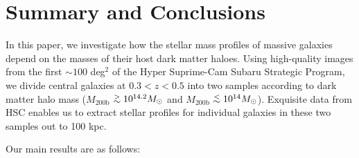 \documentclass[a4paper,fleqn,usenatbib]{mnras}
\def\simlt{\lower.5ex\hbox{$\; \buildrel < \over {\sim} \;$}}
\def\simgt{\lower.5ex\hbox{$\; \buildrel > \over {\sim} \;$}}
\def\mhalo{{$M_{\mathrm{200b}}$}}
\begin{document}


\section{Summary and Conclusions}
    \label{sec:summary}
    
    In this paper, we investigate how the stellar mass profiles of massive galaxies 
    depend on the masses of their host dark matter haloes. 
    Using high-quality images from the first $\sim100$ deg$^2$ of the Hyper Suprime-Cam 
    Subaru Strategic Program, we divide central galaxies at $0.3 < z < 0.5$ into two 
    samples according to dark matter halo mass (\mhalo{}$\simgt 10^{14.2} M_{\odot}$ 
    and \mhalo{}$\simlt 10^{14} M_{\odot}$). 
    Exquisite data from HSC enables us to extract stellar profiles for individual 
    galaxies in these two samples out to 100 kpc.
    
    Our main results are as follows:  
    
\end{document}
